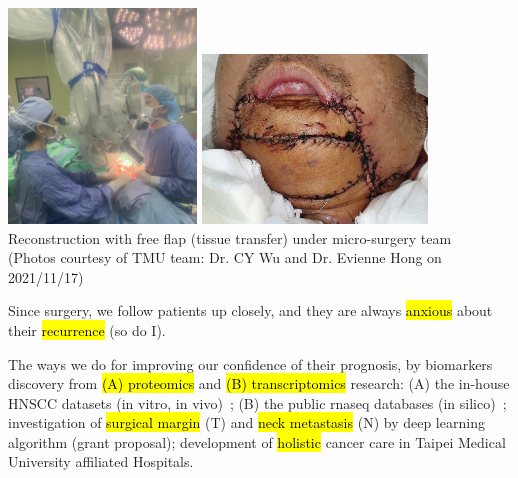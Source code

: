 \documentclass[
paper=landscape,
paper=160mm:90mm, %
fontsize=11pt, %
pagesize, %
parskip=half-, %
]{scrartcl} %
\theoremstyle{mythmstyle} %
\begin{document}
{%
\includegraphics[width=5cm]{IMG_6791.jpg}
\includegraphics[width=6cm]{IMG_6910.jpg}\\
\large Reconstruction with free flap (tissue transfer) under micro-surgery team\\
{\tiny (Photos courtesy of TMU team: Dr. CY Wu and Dr. Evienne Hong on 2021/11/17)}

\clearpage
\thispagestyle{headings}

\large Since surgery, we follow patients up closely, and they are always \hl{anxious} about their \hl{recurrence} (so do I).\vspace{5mm}

\begin{outline}
\0 The ways we do for improving our confidence of their prognosis, by
\1 biomarkers discovery from \hl{(A) proteomics} and \hl{(B) transcriptomics} research:
    \2 (A) the in-house HNSCC datasets (in vitro, in vivo)~\parencite{Chi2017};
    \2 (B) the public \acrfull{rnaseq} databases (in silico)~\autocite{Chi2021};
\1 investigation of \hl{surgical margin} (T) and \hl{neck metastasis} (N) by deep learning algorithm (grant proposal);
\1 development of \hl{holistic} cancer care in Taipei Medical University affiliated Hospitals.


\end{outline}}
\end{document}
